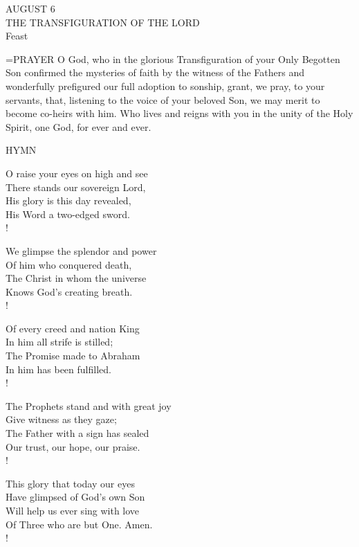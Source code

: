 \begin{center}\normalsize AUGUST 6\\
\footnotesize THE TRANSFIGURATION OF THE LORD\\
\footnotesize Feast\\
\end{center}

\hangindent=\parindent \small{PRAYER 
O God, who in the glorious Transfiguration
of your Only Begotten Son
confirmed the mysteries of faith by the witness of the Fathers
and wonderfully prefigured our full adoption to sonship,
grant, we pray, to your servants,
that, listening to the voice of your beloved Son,
we may merit to become co-heirs with him.
Who lives and reigns with you in the unity of the Holy Spirit,
one God, for ever and ever.\\}
 

\noindent\small{\uppercase{Hymn}}\normalsize\label{transfiguration:hymn}
\begin{cverse}
O raise your eyes on high and see\\
There stands our sovereign Lord,\\
His glory is this day revealed,\\
His Word a two-edged sword.\\!

We glimpse the splendor and power\\
Of him who conquered death,\\
The Christ in whom the universe\\
Knows God’s creating breath.\\!

Of every creed and nation King\\
In him all strife is stilled;\\
The Promise made to Abraham\\
In him has been fulfilled.\\!

The Prophets stand and with great joy\\
Give witness as they gaze;\\
The Father with a sign has sealed\\
Our trust, our hope, our praise.\\!

This glory that today our eyes\\
Have glimpsed of God’s own Son\\
Will help us ever sing with love\\
Of Three who are but One. Amen.\\!
\end{cverse}

